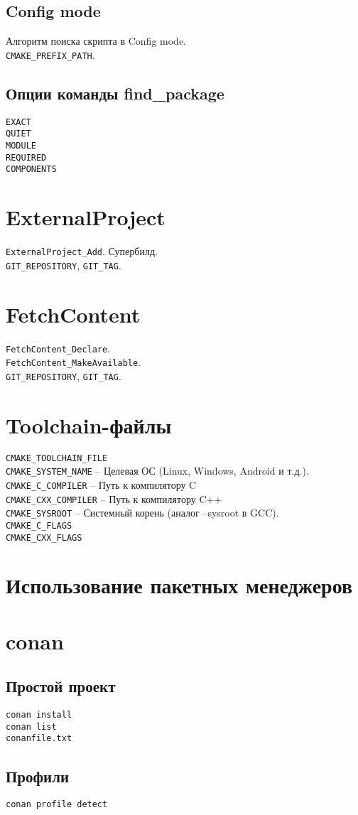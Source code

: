 \documentclass{article}
\begin{document}
\subsection*{Config mode}
Алгоритм поиска скрипта в Config mode.\\
\texttt{CMAKE\_PREFIX\_PATH}.

\subsection*{Опции команды find\_package}
\texttt{EXACT}\\
\texttt{QUIET}\\ 
\texttt{MODULE}\\
\texttt{REQUIRED}\\
\texttt{COMPONENTS}
             
\section{ExternalProject}
\texttt{ExternalProject\_Add}. Супербилд.\\
\texttt{GIT\_REPOSITORY}, \texttt{GIT\_TAG}.

\section{FetchContent}
\texttt{FetchContent\_Declare}.\\
\texttt{FetchContent\_MakeAvailable}.\\
\texttt{GIT\_REPOSITORY}, \texttt{GIT\_TAG}.

\section{Toolchain-файлы}
\texttt{CMAKE\_TOOLCHAIN\_FILE}\\

\noindent
\texttt{CMAKE\_SYSTEM\_NAME} --	Целевая ОС (Linux, Windows, Android и т.д.).\\
\texttt{CMAKE\_C\_COMPILER} --	Путь к компилятору C \\
\texttt{CMAKE\_CXX\_COMPILER} --	Путь к компилятору C++\\
\texttt{CMAKE\_SYSROOT} --	Системный корень (аналог --sysroot в GCC).\\
\texttt{CMAKE\_C\_FLAGS}\\
\texttt{CMAKE\_CXX\_FLAGS}

\section{Использование пакетных менеджеров}

\section{conan}

\subsection*{Простой проект}
\texttt{conan install}\\
\texttt{conan list}\\
\texttt{conanfile.txt}\\
\subsection*{Профили}
\texttt{conan profile detect}
\end{document}
